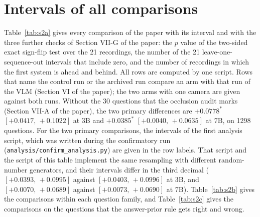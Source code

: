 \documentclass[10pt]{article}
\begin{document}
\section{Intervals of all comparisons}
Table~\ref{tab:s2a} gives every comparison of the paper with its interval and with the three further checks of Section VII-G of the paper: the $p$ value of the two-sided exact sign-flip test over the 21 recordings, the number of the 21 leave-one-sequence-out intervals that include zero, and the number of recordings in which the first system is ahead and behind. All rows are computed by one script. Rows that name the control run or the archived run compare an arm with that run of the VLM (Section VI of the paper); the two arms with one camera are given against both runs. Without the 30 questions that the occlusion audit marks (Section VII-A of the paper), the two primary differences are $+0.0778^{*}$ $[+0.0417,\,+0.1022]$ at 3B and $+0.0385^{*}$ $[+0.0040,\,+0.0635]$ at 7B, on 1298 questions. For the two primary comparisons, the intervals of the first analysis script, which was written during the confirmatory run (\texttt{analysis/confirm\_analysis.py}) are given in the row labels. That script and the script of this table implement the same resampling with different random-number generators, and their intervals differ in the third decimal ($[+0.0393,\,+0.0995]$ against $[+0.0403,\,+0.0996]$ at 3B, and $[+0.0070,\,+0.0689]$ against $[+0.0073,\,+0.0690]$ at 7B). Table~\ref{tab:s2b} gives the comparisons within each question family, and Table~\ref{tab:s2c} gives the comparisons on the questions that the answer-prior rule gets right and wrong.
\end{document}
